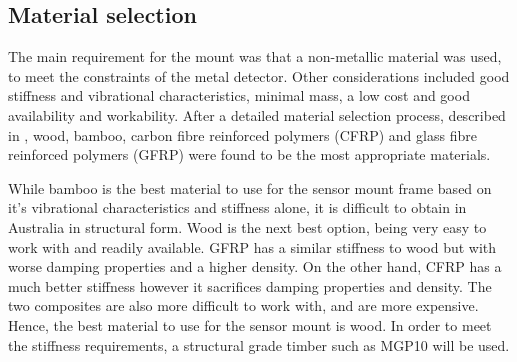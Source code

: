 \documentclass[main.tex]{subfiles}
\begin{document}
\subsection {Material selection}  
The main requirement for the mount was that a non-metallic material was used, to meet the constraints of the metal detector. Other considerations included good stiffness and vibrational characteristics, minimal mass, a low cost and good availability and workability. After a detailed material selection process, described in , wood, bamboo, carbon fibre reinforced polymers (CFRP) and glass fibre reinforced polymers (GFRP) were found to be the most appropriate materials. 

While bamboo is the best material to use for the sensor mount frame based on it's vibrational characteristics and stiffness alone, it is difficult to obtain in Australia in structural form. Wood is the next best option, being very easy to work with and readily available. GFRP has a similar stiffness to wood but with worse damping properties and a higher density. On the other hand, CFRP has a much better stiffness however it sacrifices damping properties and density. The two composites are also more difficult to work with, and are more expensive. Hence, the best material to use for the sensor mount is wood. In order to meet the stiffness requirements, a structural grade timber such as MGP10 will be used. 
 
%
%
\end{document}
